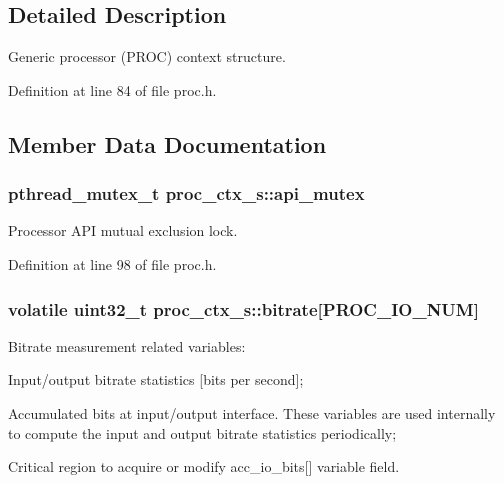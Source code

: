 \subsection{Detailed Description}
Generic processor (P\+R\+OC) context structure. 

Definition at line 84 of file proc.\+h.



\subsection{Member Data Documentation}
\subsubsection[{\texorpdfstring{api\+\_\+mutex}{api_mutex}}]{\setlength{\rightskip}{0pt plus 5cm}pthread\+\_\+mutex\+\_\+t proc\+\_\+ctx\+\_\+s\+::api\+\_\+mutex}\hypertarget{structproc__ctx__s_aea90c57d9b0a303b638a51ce7efa9a1e}{}\label{structproc__ctx__s_aea90c57d9b0a303b638a51ce7efa9a1e}
Processor A\+PI mutual exclusion lock. 

Definition at line 98 of file proc.\+h.

\subsubsection[{\texorpdfstring{bitrate}{bitrate}}]{\setlength{\rightskip}{0pt plus 5cm}volatile uint32\+\_\+t proc\+\_\+ctx\+\_\+s\+::bitrate\mbox{[}P\+R\+O\+C\+\_\+\+I\+O\+\_\+\+N\+UM\mbox{]}}\hypertarget{structproc__ctx__s_a31bad437eed5d81c08a01538416c3639}{}\label{structproc__ctx__s_a31bad437eed5d81c08a01538416c3639}
Bitrate measurement related variables\+:
\begin{DoxyItemize}
\item Input/output bitrate statistics \mbox{[}bits per second\mbox{]};
\item Accumulated bits at input/output interface. These variables are used internally to compute the input and output bitrate statistics periodically;
\item Critical region to acquire or modify \textquotesingle{}acc\+\_\+io\+\_\+bits\mbox{[}\mbox{]}\textquotesingle{} variable field. 
\end{DoxyItemize}

